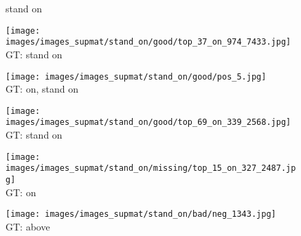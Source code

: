 \documentclass[10pt,twocolumn,letterpaper]{article}
\begin{document}
\begin{figure*}[t]
	\begin{minipage}[t]{0.005\textwidth}
    	\centering
    	\vspace{-9.5ex}
    	\begin{turn}{90}
    	stand on
    	\end{turn}
    	\vspace{5ex}
   	\end{minipage}
    \hspace{0.01\textwidth}
    \begin{minipage}[t]{0.18\textwidth}
    	\centering
       	\texttt{[image: images/images\_supmat/stand\_on/good/top\_37\_on\_974\_7433.jpg]}\\
       	\vspace{0.3ex}
       	GT: stand on
       	\vspace{0.2ex}
    \end{minipage}
    \hspace{0.005\textwidth}
    \begin{minipage}[t]{0.18\textwidth}
    	\centering
       	\texttt{[image: images/images\_supmat/stand\_on/good/pos\_5.jpg]}\\
       	\vspace{0.3ex}
       	GT: on, stand on
       	\vspace{0.2ex}
    \end{minipage} 
    \hspace{0.005\textwidth}
    \begin{minipage}[t]{0.18\textwidth}
    	\centering
       	\texttt{[image: images/images\_supmat/stand\_on/good/top\_69\_on\_339\_2568.jpg]}\\
       	\vspace{0.3ex}
       	GT: stand on
       	\vspace{0.2ex}
    \end{minipage}  
    \hspace{0.005\textwidth}
    \begin{minipage}[t]{0.18\textwidth}
       	\centering
    	\texttt{[image: images/images\_supmat/stand\_on/missing/top\_15\_on\_327\_2487.jpg]}\\
    	\vspace{0.3ex}
       	GT: on
       	\vspace{0.2ex}
    \end{minipage}
    \hspace{0.005\textwidth}
    \begin{minipage}[t]{0.18\textwidth}
    	\centering
       	\texttt{[image: images/images\_supmat/stand\_on/bad/neg\_1343.jpg]}\\
       	\vspace{0.3ex}
       	GT: above
       	\vspace{0.2ex}
    \end{minipage}      



\end{figure*}
\end{document}
